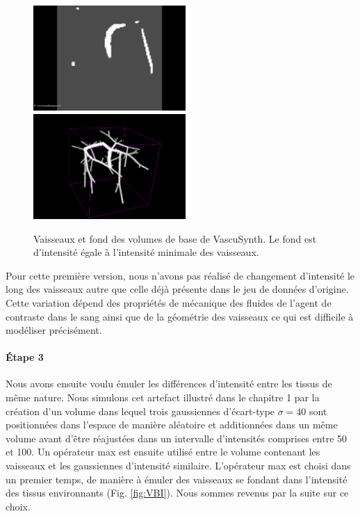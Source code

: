 \begin{figure}[!ht]
  \centering
  \includegraphics[height=4cm]{Images/2D_VB.png}
  \includegraphics[height=4cm]{Images/3D_VB.png}
  
  \caption{Vaisseaux et fond des volumes de base de VascuSynth. Le fond est d'intensité égale à l'intensité minimale des vaisseaux.}
  \label{fig:VB}
\end{figure}

Pour cette première version, nous n'avons pas réalisé de changement d'intensité le long des vaisseaux autre que celle déjà présente dans le jeu de données d'origine. Cette variation dépend des propriétés de mécanique des fluides de l'agent de contraste dans le sang ainsi que de la géométrie des vaisseaux ce qui est difficile à modéliser précisément.

\paragraph{Étape 3}
Nous avons ensuite voulu émuler les différences d'intensité entre les tissus de même nature. Nous simulons cet artefact illustré dans le chapitre 1 par la création d'un volume dans lequel trois gaussiennes d'écart-type $\sigma=40$ sont positionnées dans l'espace de manière aléatoire et additionnées dans un même volume avant d'être réajustées dans un intervalle d'intensités comprises entre 50 et 100. Un opérateur max est ensuite utilisé entre le volume contenant les vaisseaux et les gaussiennes d'intensité similaire. L'opérateur max est choisi dans un premier temps, de manière à émuler des vaisseaux se fondant dans l'intensité des tissus environnants (Fig. \ref{fig:VBI}). Nous sommes revenus par la suite sur ce choix.

